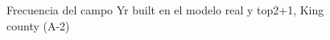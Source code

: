 \begin{figure}[H]
    \centering
    
    \caption{Frecuencia del campo Yr built en el modelo real y top2+1, King county (A-2)}
    \label{frecuency-top2+1-yr built}
\end{figure}